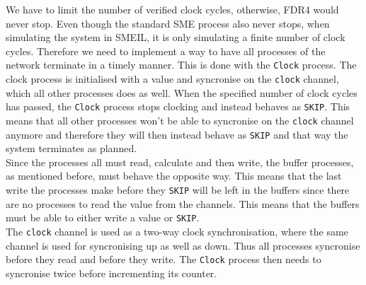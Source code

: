 We have to limit the number of verified clock cycles, otherwise, FDR4 would never stop. Even though the standard SME process also never stops, when simulating the system in SMEIL, it is only simulating a finite number of clock cycles. Therefore we need to implement a way to have all processes of the \cspm{} network terminate in a timely manner. This is done with the \texttt{Clock} process. The clock process is initialised with a value and syncronise on the \texttt{clock} channel, which all other processes does as well. When the specified number of clock cycles has passed, the \texttt{Clock} process stops clocking and instead behaves as \texttt{SKIP}. This means that all other processes won't be able to syncronise on the \texttt{clock} channel anymore and therefore they will then instead behave as \texttt{SKIP} and that way the system terminates as planned.\\
Since the processes all must read, calculate and then write, the buffer processes, as mentioned before, must behave the opposite way. This means that the last write the processes make before they \texttt{SKIP} will be left in the buffers since there are no processes to read the value from the channels. This means that the buffers must be able to either write a value or \texttt{SKIP}.\\
The \texttt{clock} channel is used as a two-way clock synchronisation, where the same channel is used for syncronising up as well as down. Thus all processes syncronise before they read and before they write. The \texttt{Clock} process then needs to syncronise twice before incrementing its counter. \\

